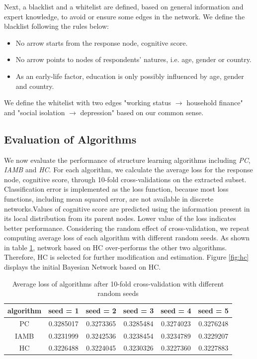\documentclass[11pt,twoside]{article}
\numberwithin{Theorem}{section}
\numberwithin{Definition}{section}
\numberwithin{Lemma}{section}
\numberwithin{Algorithm}{section}
\numberwithin{equation}{section}
\begin{document}
Next, a blacklist and a whitelist are defined, based on general information and expert knowledge, to avoid or ensure some edges in the network. We define the blacklist following the rules below:

\begin{itemize}
	\item No arrow starts from the response node, cognitive score.
	\item No arrow points to nodes of respondents' natures, i.e. age, gender or country.
	\item As an early-life factor, education is only possibly influenced by age, gender and country.
\end{itemize}

We define the whitelist with two edges "working status $\rightarrow$ household finance" and "social isolation $\rightarrow$ depression" based on our common sense.

\subsection{Evaluation of Algorithms}

We now evaluate the performance of structure learning algorithms including \emph{PC}, \emph{IAMB} and \emph{HC}. For each algorithm, we calculate the average loss for the response node, cognitive score, through 10-fold cross-validations on the extracted subset. Classification error is implemented as the loss function, because most loss functions, including mean squared error, are not available in discrete networks.Values of cognitive score are predicted using the information present in its local distribution from its parent nodes. Lower value of the loss indicates better performance. Considering the random effect of cross-validation, we repeat computing average loss of each algorithm with different random seeds. As shown in table \ref{tab:bn_cv}, network based on HC over-performs the other two algorithms. Therefore, HC is selected for further modification and estimation. Figure \ref{fig:hc} displays the initial Bayesian Network based on HC.

\begin{table}[!h]
	\centering
	\begin{tabular}{|c|c|c|c|c|c|}
		\hline
		algorithm & seed = 1 & seed = 2 & seed = 3 & seed = 4 & seed = 5 \\
		\hline
		PC & 0.3285017 & 0.3273365 & 0.3285484 & 0.3274023 &  0.3276248 \\
		IAMB & 0.3231999 & 0.3242536 & 0.3238454 & 0.3234789 & 0.3229207 \\
		HC & 0.3226488 & 0.3224045 & 0.3230326 & 0.3227360 & 0.3227883 \\
		\hline
	\end{tabular}
	\caption{Average loss of algorithms after 10-fold cross-validation with different random seeds}
	\label{tab:bn_cv}
\end{table}
\end{document}
